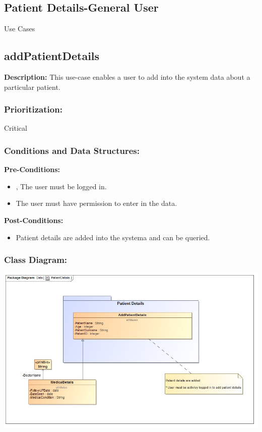 
\newpage
\setlength{\voffset}{-3cm}

\begin{center}
\section{\textbf{\huge{Patient Details-General User}}}

\Large{Use Cases}
\end{center}


\subsection{addPatientDetails}
\textbf{Description:}
This use-case enables a user to add into the system data about a particular patient.
\subsubsection{Prioritization:}
Critical
\subsubsection{Conditions and Data Structures:}
\textbf{Pre-Conditions:}
\begin{itemize}
	\item , The user must be logged in.
	\item The user must have permission to enter in the data.
\end{itemize}

\textbf{Post-Conditions:}	
\begin{itemize}
	\item Patient details are added into the systema and can be queried.
\end{itemize}

\subsubsection{Class Diagram:} 
\includegraphics[width=1\linewidth]{./Graphics/addPatient}





